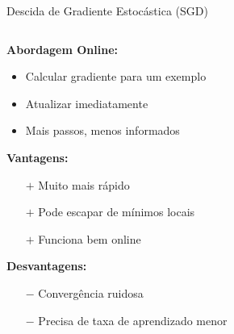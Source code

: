 \documentclass[xcolor=dvipsnames,t,aspectratio=169]{beamer}
\newcommand{\highlight}[1]{{\color{nes_dark_orange} #1}}
\begin{document}
\begin{frame}[c]{Descida de Gradiente Estocástica (SGD)}
    \begin{columns}[c]
        \begin{column}{0.55\textwidth}
            \textbf{Abordagem Online:}
            \begin{itemize}
                \item Calcular gradiente para \highlight{um exemplo}
                \item Atualizar imediatamente
                \item Mais passos, menos informados
            \end{itemize}
            
            \vspace{0.5cm}
            \textbf{Vantagens:}
            \begin{itemize}
                \item[$+$] Muito mais rápido
                \item[$+$] Pode escapar de mínimos locais
                \item[$+$] Funciona bem online
            \end{itemize}
            
            \textbf{Desvantagens:}
            \begin{itemize}
                \item[$-$] Convergência ruidosa
                \item[$-$] Precisa de taxa de aprendizado menor
            \end{itemize}
        \end{column}
        \begin{column}{0.45\textwidth}
        \end{column}
    \end{columns}
\end{frame}
\end{document}
